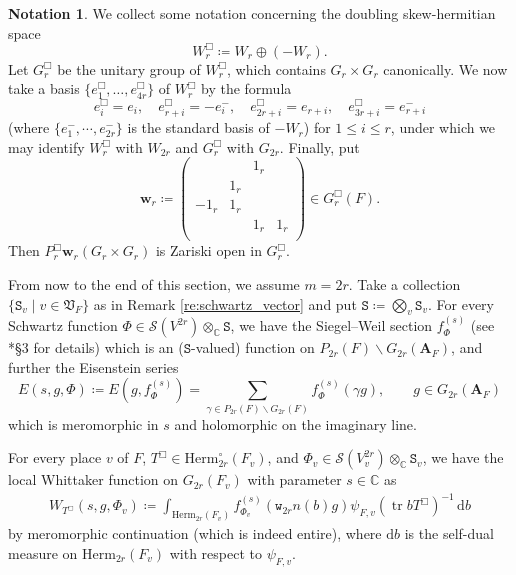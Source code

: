 \documentclass[12pt]{amsart}
\numberwithin{equation}{section}
\theoremstyle{plain}
\theoremstyle{definition}
\newtheorem{notation}[proposition]{Notation}
\theoremstyle{remark}
\renewcommand{\b}[1]{\mathbf{#1}}
\renewcommand{\d}[1]{\mathbb{#1}}
\newcommand{\f}[1]{\mathfrak{#1}}
\renewcommand{\r}[1]{\mathrm{#1}}
\newcommand{\s}[1]{\mathscr{#1}}
\renewcommand{\(}{\left(}
\renewcommand{\)}{\right)}
\newcommand{\res}{\mathbin{|}}
\renewcommand{\leq}{\leqslant}
\newcommand{\bA}{\b A}
\newcommand{\bw}{\b w}
\newcommand{\dC}{\d C}
\newcommand{\fV}{\f V}
\newcommand{\rd}{\,\r d}
\newcommand{\sS}{\s S}
\newcommand{\tS}{\mathtt{S}}
\newcommand{\tw}{\mathtt{w}}
\newcommand{\Herm}{\r{Herm}}
\DeclareMathOperator{\tr}{tr}
\begin{document}
\begin{notation}\label{no:doubling_space}
We collect some notation concerning the doubling skew-hermitian space
\[
W_r^\Box\coloneqq W_r\oplus(-W_r).
\]
Let $G_r^\Box$ be the unitary group of $W_r^\Box$, which contains $G_r\times G_r$ canonically. We now take a basis $\{e^\Box_1,\dots,e^\Box_{4r}\}$ of $W_r^\Box$ by the formula
\[
e^\Box_i=e_i,\quad e^\Box_{r+i}=-e_i^-,\quad e^\Box_{2r+i}=e_{r+i}, \quad e^\Box_{3r+i}=e_{r+i}^-
\]
(where $\{e_1^-,\cdots,e_{2r}^-\}$ is the standard basis of $-W_r$) for $1\leq i\leq r$, under which we may identify $W_r^\Box$ with $W_{2r}$ and $G_r^\Box$ with $G_{2r}$. Finally, put
\[
\bw_r\coloneqq
\begin{pmatrix}
     &  & 1_r &  \\
     & 1_r &  &  \\
    -1_r & 1_r &  &  \\
     &  & 1_r & 1_r \\
\end{pmatrix}
\in G_r^\Box(F).
\]
Then $P_r^\Box\bw_r(G_r\times G_r)$ is Zariski open in $G_r^\Box$.
\end{notation}





From now to the end of this section, we assume $m=2r$. Take a collection $\{\tS_v\res v\in\fV_F\}$ as in Remark \ref{re:schwartz_vector} and put $\tS\coloneqq\bigotimes_v\tS_v$. For every Schwartz function $\Phi\in\sS(V^{2r})\otimes_\dC\tS$, we have the Siegel--Weil section $f_\Phi^{(s)}$ (see \cite{LL21}*{\S3} for details) which is an ($\tS$-valued) function on $P_{2r}(F)\backslash G_{2r}(\bA_F)$, and further the Eisenstein series
\[
E(s,g,\Phi)\coloneqq E(g,f_{\Phi}^{(s)})=\sum_{\gamma\in P_{2r}(F)\backslash G_{2r}(F)}f_\Phi^{(s)}(\gamma g),
\qquad g\in G_{2r}(\bA_F)
\]
which is meromorphic in $s$ and holomorphic on the imaginary line.

For every place $v$ of $F$, $T^\Box\in\Herm_{2r}^\circ(F_v)$, and $\Phi_v\in\sS(V_v^{2r})\otimes_\dC\tS_v$, we have the local Whittaker function on $G_{2r}(F_v)$ with parameter $s\in\dC$ as
\begin{align}\label{eq:local_whittaker}
W_{T^\Box}(s,g,\Phi_v)\coloneqq\int_{\Herm_{2r}(F_v)}f^{(s)}_{\Phi_v}(\tw_{2r}n(b)g)\psi_{F,v}(\tr bT^\Box)^{-1}\rd b
\end{align}
by meromorphic continuation (which is indeed entire), where $\r{d}b$ is the self-dual measure on $\Herm_{2r}(F_v)$ with respect to $\psi_{F,v}$.
\end{document}
